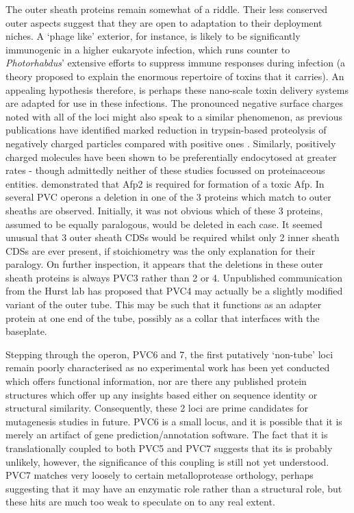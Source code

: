 The outer sheath proteins remain somewhat of a riddle. Their less conserved outer aspects suggest that they are open to adaptation to their deployment niches. A `phage like' exterior, for instance, is likely to be significantly immunogenic in a higher eukaryote infection, which runs counter to \emph{Photorhabdus}' extensive efforts to suppress immune responses during infection (a theory proposed to explain the enormous repertoire of toxins that it carries). An appealing hypothesis therefore, is perhaps these nano-scale toxin delivery systems are adapted for use in these infections. The pronounced negative surface charges noted with all of the loci might also speak to a similar phenomenon, as previous publications have identified marked reduction in trypsin-based proteolysis of negatively charged particles compared with positive ones \citep{Liu1992}. Similarly, positively charged molecules have been shown to be preferentially endocytosed at greater rates \citep{Chung2007} - though admittedly neither of these studies focussed on proteinaceous entities. \cite{Hurst2004} demonstrated that Afp2 is required for formation of a toxic Afp. In several PVC operons a deletion in one of the 3 proteins which match to outer sheaths are observed. Initially, it was not obvious which of these 3 proteins, assumed to be equally paralogous, would be deleted in each case. It seemed unusual that 3 outer sheath CDSs would be required whilst only 2 inner sheath CDSs are ever present, if stoichiometry was the only explanation for their paralogy. On further inspection, it appears that the deletions in these outer sheath proteins is always PVC3 rather than 2 or 4. Unpublished communication from the Hurst lab has proposed that PVC4 may actually be a slightly modified variant of the outer tube. This may be such that it functions as an adapter protein at one end of the tube, possibly as a collar that interfaces with the baseplate.

Stepping through the operon, PVC6 and 7, the first putatively `non-tube' loci remain poorly characterised as no experimental work has been yet conducted which offers functional information, nor are there any published protein structures which offer up any insights based either on sequence identity or structural similarity. Consequently, these 2 loci are prime candidates for mutagenesis studies in future. PVC6 is a small locus, and it is possible that it is merely an artifact of gene prediction/annotation software. The fact that it is translationally coupled to both PVC5 and PVC7 suggests that its is probably unlikely, however, the significance of this coupling is still not yet understood. PVC7 matches very loosely to certain metalloprotease orthology, perhaps suggesting that it may have an enzymatic role rather than a structural role, but these hits are much too weak to speculate on to any real extent.

